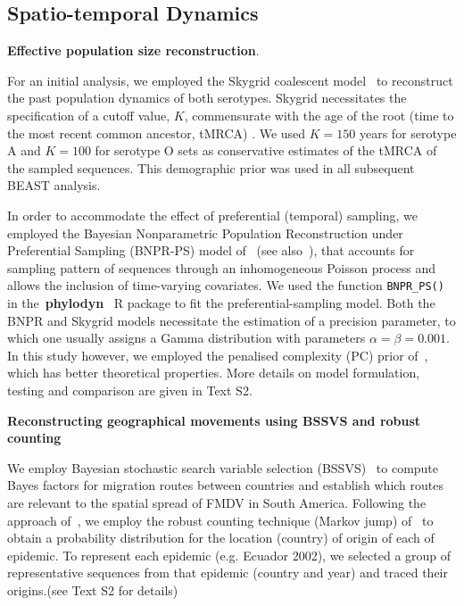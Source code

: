 \documentclass[10pt]{article}
\begin{document}
\subsection*{Spatio-temporal Dynamics}

\textbf{Effective population size reconstruction}.

For an initial analysis, we employed the Skygrid coalescent model~\citep{Gill2013,Hill2019} %
 to reconstruct the past population dynamics of both serotypes.
Skygrid necessitates the specification of a cutoff value, $K$, commensurate with the age of the root (time to the most recent common ancestor, tMRCA) .
We used $K = 150$ years for serotype A and $K = 100$ for serotype O sets as conservative estimates of the tMRCA of the sampled sequences. 
This demographic prior was used in all subsequent BEAST analysis.

In order to accommodate the effect of preferential (temporal) sampling, we employed the Bayesian Nonparametric Population Reconstruction under Preferential Sampling (BNPR-PS) model of~\cite{Karcher2019} (see also~\cite{Karcher2016}), that accounts for sampling pattern of sequences through an inhomogeneous Poisson process and allows the inclusion of time-varying covariates.
We used the function \verb|BNPR_PS()| in the~\textbf{phylodyn}~\citep{Karcher2017} R package to fit the preferential-sampling model. %
Both the BNPR and Skygrid models necessitate the estimation of a precision parameter, to which one usually assigns a Gamma distribution with parameters $\alpha = \beta = 0.001$.
In this study however, we employed the penalised complexity (PC) prior of~\cite{Simpson2017}, which has better theoretical properties. %
More details on model formulation, testing and comparison are given in Text S2. %

\textbf{Reconstructing geographical movements using BSSVS and robust counting}

We employ Bayesian stochastic search variable selection (BSSVS)~\citep{Lemey2009} to compute Bayes factors for migration routes between countries and establish which routes are relevant to the spatial spread of FMDV in South America.
Following the approach of~\citet{Hall2013}, we employ the robust counting technique (Markov jump) of~\cite{Minin2008b} to obtain a probability distribution for the location (country) of origin of each of epidemic.
To represent each epidemic (e.g. Ecuador 2002), we selected a group of representative sequences from that epidemic (country and year) and traced their origins.(see Text S2 for details)
\end{document}
